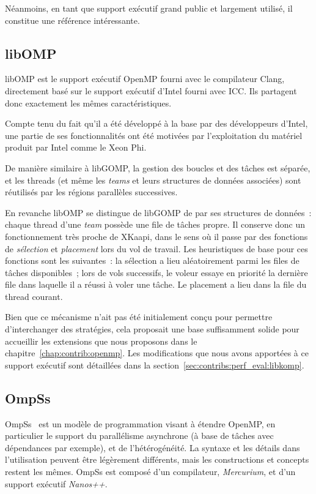 Néanmoins, en tant que support exécutif grand public et largement utilisé, il constitue une référence intéressante.

\subsection{libOMP}

libOMP est le support exécutif OpenMP fourni avec le compilateur Clang, directement basé sur le support exécutif d'Intel fourni avec ICC.
Ils partagent donc exactement les mêmes caractéristiques.

Compte tenu du fait qu'il a été développé à la base par des développeurs d'Intel, une partie de ses fonctionnalités ont été motivées par l'exploitation du matériel produit par Intel comme le Xeon Phi.

De manière similaire à libGOMP, la gestion des boucles et des tâches est séparée, et les threads (et même les \emph{teams} et leurs structures de données associées) sont réutilisés par les régions parallèles successives.

En revanche libOMP se distingue de libGOMP de par ses structures de données~: chaque thread d'une \emph{team} possède une file de tâches propre.
Il conserve donc un fonctionnement très proche de XKaapi, dans le sens où il passe par des fonctions de \emph{sélection} et \emph{placement} lors du vol de travail.
Les heuristiques de base pour ces fonctions sont les suivantes~: la sélection a lieu aléatoirement parmi les files de tâches disponibles~; lors de vols successifs, le voleur essaye en priorité la dernière file dans laquelle il a réussi à voler une tâche. Le placement a lieu dans la file du thread courant.

Bien que ce mécanisme n'ait pas été initialement conçu pour permettre d'interchanger des stratégies, cela proposait une base suffisamment solide pour accueillir les extensions que nous proposons dans le chapitre~\ref{chap:contrib:openmp}.
Les modifications que nous avons apportées à ce support exécutif sont détaillées dans la section~\ref{sec:contribs:perf_eval:libkomp}.


\subsection{OmpSs}\label{subsec:rw:ompss}

OmpSs~\cite{OMPSs} est un modèle de programmation visant à étendre OpenMP, en particulier le support du parallélisme asynchrone (à base de tâches avec dépendances par exemple), et de l'hétérogénéité.
La syntaxe et les détails dans l'utilisation peuvent être légèrement différents, mais les constructions et concepts restent les mêmes.
OmpSs est composé d'un compilateur, \emph{Mercurium}, et d'un support exécutif \emph{Nanos++}.


